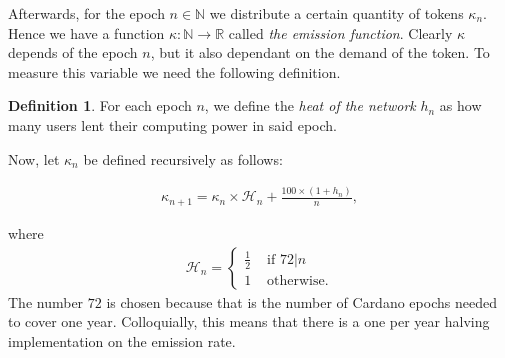 \documentclass[11pt]{amsart}
\numberwithin{equation}{section}
\theoremstyle{definition}
\newtheorem{definition}[theorem]{Definition}
\theoremstyle{remark}
\newcommand{\N}{\mathbb N}
\renewcommand{\_}[1]{_{\left( #1 \right)}}
\renewcommand{\^}[1]{^{\left( #1 \right)}}
\begin{document}
Afterwards, for the epoch $n\in\N$ we distribute a certain quantity of tokens $\kappa_n$. Hence we have a function $\kappa\colon \N \longrightarrow \mathbb{R}$ called \emph{the emission function}. Clearly $\kappa$ depends of the epoch $n$, but it also dependant on the demand of the token. To measure this variable we need the following definition.


\begin{definition}
	For each epoch $n$, we define the \emph{heat of the network} $h_n$ as how many users lent their computing power in said epoch.
\end{definition}

Now, let $\kappa_n$ be defined recursively as follows:

\begin{align*}
\kappa_{n+1} = \kappa_n \times \mathcal{H}_n+ \frac{100\times (1+ h_n)}{n},
\end{align*}

where 
\begin{align*}
\mathcal{H}_n = \begin{cases*}
\frac{1}{2}& \text{ if } 72| n\\
1 & \text{ otherwise}.
\end{cases*}
\end{align*}
The number $72$ is chosen because that is the number of Cardano epochs needed to cover one year. Colloquially, this means that there is a one per year halving implementation on the emission rate. 
\end{document}
